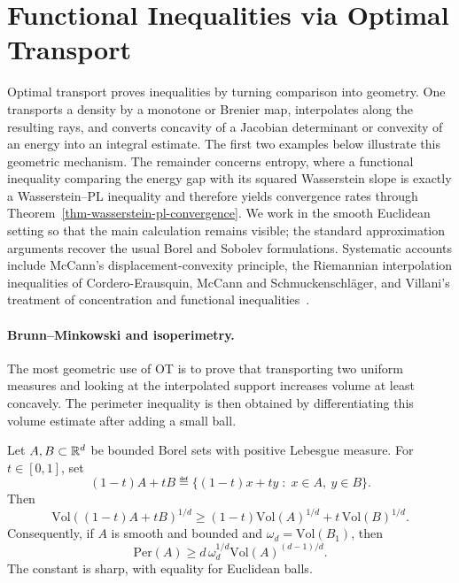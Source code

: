 \section{Functional Inequalities via Optimal Transport}

Optimal transport proves inequalities by turning comparison into geometry. One transports a density by a monotone or Brenier map, interpolates along the resulting rays, and converts concavity of a Jacobian determinant or convexity of an energy into an integral estimate. The first two examples below illustrate this geometric mechanism. The remainder concerns entropy, where a functional inequality comparing the energy gap with its squared Wasserstein slope is exactly a Wasserstein--PL inequality and therefore yields convergence rates through Theorem~\ref{thm-wasserstein-pl-convergence}. We work in the smooth Euclidean setting so that the main calculation remains visible; the standard approximation arguments recover the usual Borel and Sobolev formulations. Systematic accounts include McCann's displacement-convexity principle, the Riemannian interpolation inequalities of Cordero-Erausquin, McCann and Schmuckenschl\"ager, and Villani's treatment of concentration and functional inequalities~\cite{mccann1997convexity,cordero2001riemannian,Villani09}.

\paragraph{Brunn--Minkowski and isoperimetry.}
The most geometric use of OT is to prove that transporting two uniform measures and looking at the interpolated support increases volume at least concavely. The perimeter inequality is then obtained by differentiating this volume estimate after adding a small ball.

\begin{prop}\label{prop-ot-brunn-minkowski-isoperimetric}
	Let $A,B\subset\mathbb{R}^d$ be bounded Borel sets with positive Lebesgue measure. For $t\in[0,1]$, set
	\[
		(1-t)A+tB\eqdef\{(1-t)x+ty\;:\;x\in A,\ y\in B\}.
	\]
	Then
	\[
		\mathrm{Vol}((1-t)A+tB)^{1/d}
		\geq
		(1-t)\mathrm{Vol}(A)^{1/d}
		+
		t\,\mathrm{Vol}(B)^{1/d}.
	\]
	Consequently, if $A$ is smooth and bounded and $\omega_d=\mathrm{Vol}(B_1)$, then
	\[
		\mathrm{Per}(A)
		\geq
		d\,\omega_d^{1/d}\mathrm{Vol}(A)^{(d-1)/d}.
	\]
	The constant is sharp, with equality for Euclidean balls.
\end{prop}


